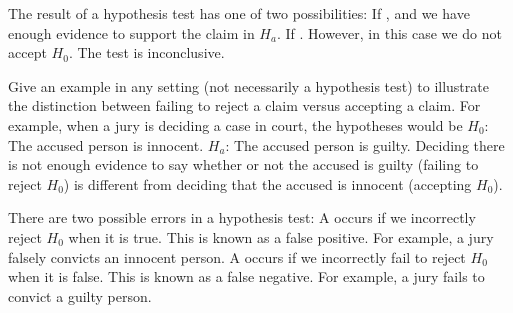 \pagestyle{fancy}
\renewcommand{\theUnit}{8}
\ifthenelse{\isundefined{\UnitPageNumbers}}{}{\setcounter{page}{1}}
\rhead{Chapter  \theUnit: Hypothesis Tests}
\rfoot{\mypage}
\renewcommand{\footrulewidth}{.4pt}
\vspace*{-20pt} \thispagestyle{firstfooter}




\bbox
The  result of a hypothesis test has one of two possibilities:
\bi
\ii If \textbf{}, and we have enough evidence to support the claim in $H_a$.
\ii If \textbf{}. However, in this case we do not accept $H_0$. The test is inconclusive.
\ei
\ebox

\bb[resume]
\ii Give an example in any setting (not necessarily a hypothesis test) to illustrate the distinction between failing to reject a claim versus accepting a claim. For example, when a jury is deciding a case in court, the hypotheses would be
\bi
\ii $H_0$: The accused person is innocent.
\ii $H_a$: The accused person is guilty.
\ei
Deciding there is not enough evidence to say whether or not the accused is guilty (failing to reject $H_0$) is different from deciding that the accused is innocent (accepting $H_0$).
\ee

\vfill

\bbox
There are two possible errors in a hypothesis test:
\bi
\ii A \textbf{} occurs if we incorrectly reject $H_0$ when it is true.
\bi
\ii This  is known as a false positive.
\ii For example, a jury falsely convicts an innocent person.
\ei
\ii A \textbf{} occurs if we incorrectly fail to reject $H_0$ when it is false.
\bi
\ii This  is known as a false negative.
\ii For example, a jury fails to convict a guilty person.
\ei
\ei
\ebox


